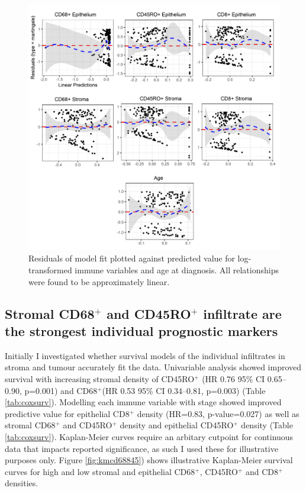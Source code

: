 \begin{figure}
    \centering
    \includegraphics[width=\textwidth]{Chapter2/Figs/Raster/modelfit_2-08.png}
    \caption[Residuals of model fit]{Residuals of model fit plotted against predicted value for log-transformed immune variables and age at diagnosis. All relationships were found to be approximately linear.}
    \label{fig:modelfit}
\end{figure}



\subsection[Prognostic value of individual infiltrates]{Stromal CD68$^+$ and CD45RO$^+$ infiltrate are the strongest individual prognostic markers}

Initially I investigated whether survival models of the individual infiltrates in stroma and tumour accurately fit the data. Univariable analysis showed improved survival with increasing stromal density of CD45RO$^+$ (HR 0.76 95\% CI 0.65–0.90, p=0.001) and CD68$^+$(HR 0.53 95\% CI 0.34–0.81, p=0.003) (Table \ref{tab:coxsurv}). Modelling each immune variable with stage showed improved predictive value for epithelial CD8$^+$ density (HR=0.83, p-value=0.027) as well as stromal CD68$^+$ and CD45RO$^+$ density and epithelial CD45RO$^+$ density (Table  \ref{tab:coxsurv}). Kaplan-Meier curves require an arbitary cutpoint for continuous data that impacts reported significance, as such I used these for illustrative purposes only. Figure \ref{fig:kmcd68845}) shows illustrative Kaplan-Meier survival curves for high and low stromal and epithelial CD68$^+$, CD45RO$^+$ and CD8$^+$ densities.\\



